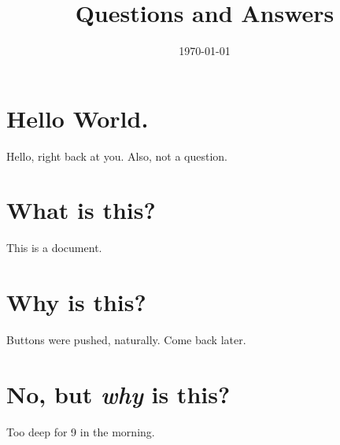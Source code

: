 \documentclass[11pt,letterpaper]{article}
\author{}
\title{Questions and Answers}
\date{\today}
\begin{document}
\maketitle

\section{Hello World.}
Hello, right back at you. Also, not a question.

\section{What is this?}
This is a document.

\section{Why is this?}
Buttons were pushed, naturally. Come back later.

\section{No, but \textit{why} is this?}
Too deep for 9 in the morning.
\end{document}
